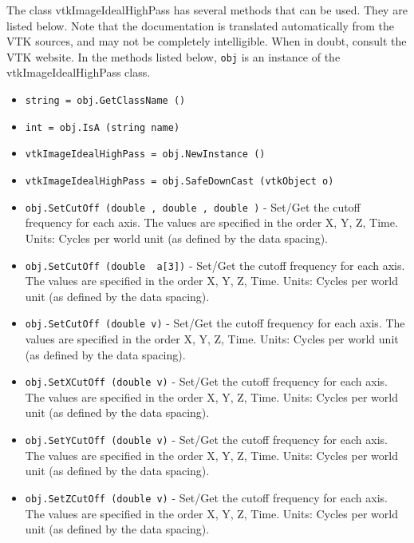 The class vtkImageIdealHighPass has several methods that can be used.
  They are listed below.
Note that the documentation is translated automatically from the VTK sources,
and may not be completely intelligible.  When in doubt, consult the VTK website.
In the methods listed below, \verb|obj| is an instance of the vtkImageIdealHighPass class.
\begin{itemize}
\item  \verb|string = obj.GetClassName ()|

\item  \verb|int = obj.IsA (string name)|

\item  \verb|vtkImageIdealHighPass = obj.NewInstance ()|

\item  \verb|vtkImageIdealHighPass = obj.SafeDownCast (vtkObject o)|

\item  \verb|obj.SetCutOff (double , double , double )| -  Set/Get the cutoff frequency for each axis.
 The values are specified in the order X, Y, Z, Time.
 Units: Cycles per world unit (as defined by the data spacing).

\item  \verb|obj.SetCutOff (double  a[3])| -  Set/Get the cutoff frequency for each axis.
 The values are specified in the order X, Y, Z, Time.
 Units: Cycles per world unit (as defined by the data spacing).

\item  \verb|obj.SetCutOff (double v)| -  Set/Get the cutoff frequency for each axis.
 The values are specified in the order X, Y, Z, Time.
 Units: Cycles per world unit (as defined by the data spacing).

\item  \verb|obj.SetXCutOff (double v)| -  Set/Get the cutoff frequency for each axis.
 The values are specified in the order X, Y, Z, Time.
 Units: Cycles per world unit (as defined by the data spacing).

\item  \verb|obj.SetYCutOff (double v)| -  Set/Get the cutoff frequency for each axis.
 The values are specified in the order X, Y, Z, Time.
 Units: Cycles per world unit (as defined by the data spacing).

\item  \verb|obj.SetZCutOff (double v)| -  Set/Get the cutoff frequency for each axis.
 The values are specified in the order X, Y, Z, Time.
 Units: Cycles per world unit (as defined by the data spacing).


\end{itemize}
